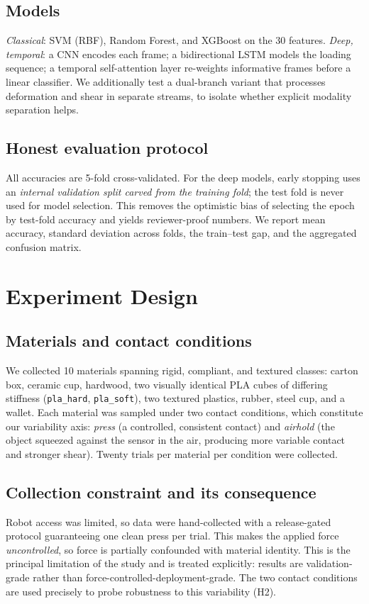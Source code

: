 \documentclass[conference]{IEEEtran}
\begin{document}
\subsection{Models}
\emph{Classical}: SVM (RBF), Random Forest, and XGBoost on the 30 features.
\emph{Deep, temporal}: a CNN encodes each frame; a bidirectional LSTM models the
loading sequence; a temporal self-attention layer re-weights informative frames
before a linear classifier. We additionally test a dual-branch variant that
processes deformation and shear in separate streams, to isolate whether explicit
modality separation helps.

\subsection{Honest evaluation protocol}
All accuracies are 5-fold cross-validated. For the deep models, early stopping
uses an \emph{internal validation split carved from the training fold}; the test
fold is never used for model selection. This removes the optimistic bias of
selecting the epoch by test-fold accuracy and yields reviewer-proof numbers. We
report mean accuracy, standard deviation across folds, the train--test gap, and
the aggregated confusion matrix.

\section{Experiment Design}
\subsection{Materials and contact conditions}
We collected 10 materials spanning rigid, compliant, and textured classes:
carton box, ceramic cup, hardwood, two visually identical PLA cubes of differing
stiffness (\texttt{pla\_hard}, \texttt{pla\_soft}), two textured plastics, rubber,
steel cup, and a wallet. Each material was sampled under two contact conditions,
which constitute our variability axis: \emph{press} (a controlled, consistent
contact) and \emph{airhold} (the object squeezed against the sensor in the air,
producing more variable contact and stronger shear). Twenty trials per material
per condition were collected.

\subsection{Collection constraint and its consequence}
Robot access was limited, so data were hand-collected with a release-gated
protocol guaranteeing one clean press per trial. This makes the applied force
\emph{uncontrolled}, so force is partially confounded with material identity.
This is the principal limitation of the study and is treated explicitly: results
are validation-grade rather than force-controlled-deployment-grade. The two
contact conditions are used precisely to probe robustness to this variability
(H2).
\end{document}
